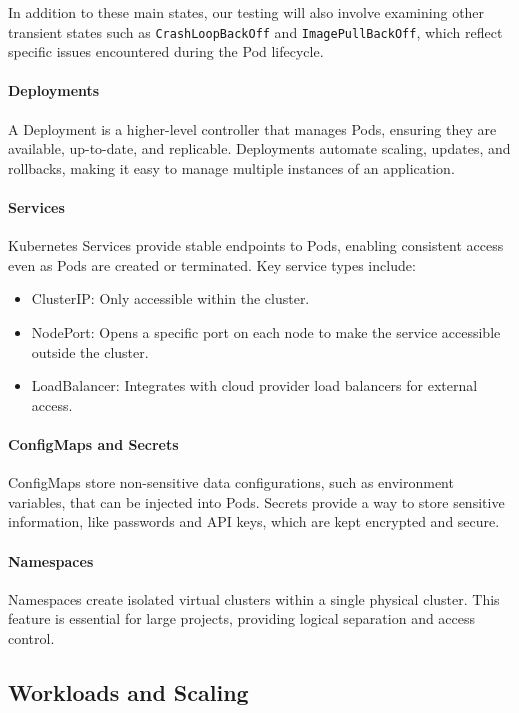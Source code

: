 \documentclass[main.tex]{subfiles}
\begin{document}
In addition to these main states, our testing will also involve examining other transient states such as \texttt{CrashLoopBackOff} and \texttt{ImagePullBackOff}, which reflect specific issues encountered during the Pod lifecycle.



\paragraph{Deployments}
A Deployment is a higher-level controller that manages Pods, ensuring they are available, up-to-date, and replicable. Deployments automate scaling, updates, and rollbacks, making it easy to manage multiple instances of an application.

\paragraph{Services}
Kubernetes Services provide stable endpoints to Pods, enabling consistent access even as Pods are created or terminated. Key service types include:
\begin{itemize}
\item ClusterIP: Only accessible within the cluster.
\item NodePort: Opens a specific port on each node to make the service accessible outside the cluster.
\item LoadBalancer: Integrates with cloud provider load balancers for external access.
\end{itemize}

\paragraph{ConfigMaps and Secrets}
ConfigMaps store non-sensitive data configurations, such as environment variables, that can be injected into Pods.
Secrets provide a way to store sensitive information, like passwords and API keys, which are kept encrypted and secure.

\paragraph{Namespaces}
Namespaces create isolated virtual clusters within a single physical cluster. This feature is essential for large projects, providing logical separation and access control.

\subsection{Workloads and Scaling}
\end{document}
